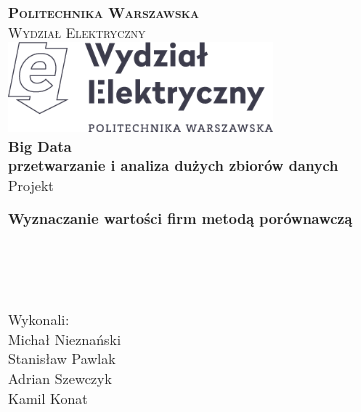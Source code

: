 

\begin{titlepage}

	
	\thispagestyle{fancy}							%
	\fancyhf{}										%
	\renewcommand{\headrulewidth}{0pt}				%
	
	\linespread{1.0}								%

	\center
	
	
	\textsc{\LARGE \textbf{Politechnika Warszawska}}\\[0.75cm]
	\textsc{\Large Wydział Elektryczny}\\[2cm]


	\includegraphics[width=7cm]{figures/WE-znak}\\[2cm]
	
	
	{\LARGE \textbf{Big Data \\ przetwarzanie i analiza dużych zbiorów danych}\\[0.3cm]}
	{\Large Projekt\\[2.5cm]}
		
	
	{\huge \bfseries Wyznaczanie wartości firm metodą porównawczą}\\[4.5cm]

	
	\large
	\begin{minipage}{0.2\textwidth}
	~
	\end{minipage}
	~
	\begin{minipage}{0.7\textwidth}
		\begin{flushright}
		Wykonali:\\
 		Michał Nieznański\\
 		Stanisław Pawlak\\
 		Adrian Szewczyk\\
		Kamil Konat
 		
		\end{flushright}
	\end{minipage}	
	
\end{titlepage}

